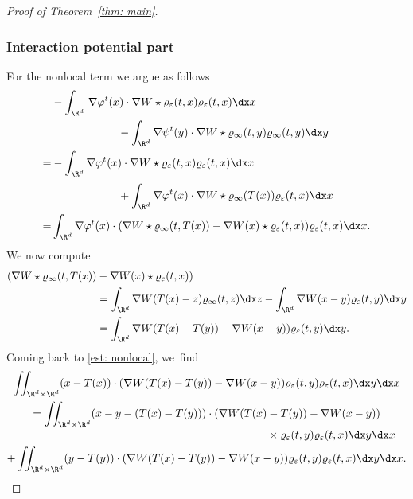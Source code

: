 \begin{proof}[Proof of Theorem~\ref{thm: main}]
\subsubsection*{Interaction potential part}
For the nonlocal term we argue as follows\vspace*{-3pt}
\begin{equation}\label{est: nonlocal}
\begin{split}
&- \int_{\R^d}\!\ \nabla \varphi^t (x) \cdot \nabla W\star \varrho_\varepsilon (t,x) \varrho_\varepsilon(t,x) \dx x\\
&\qquad\qquad\qquad - \int_{\R^d} \nabla \psi^t (y) \cdot \nabla W\star \varrho_\infty (t,y) \varrho_\infty(t,y) \dx y\\
=&- \int_{\R^d} \nabla \varphi^t (x) \cdot \nabla W\star \varrho_\varepsilon (t,x) \varrho_\varepsilon(t,x) \dx x\\[0.2em]
&\qquad\qquad\qquad+ \int_{\R^d} \nabla \varphi^t (x) \cdot \nabla W\star \varrho_\infty (T(x)) \varrho_\varepsilon(t,x) \dx x\\
=&\int_{\R^d} \nabla \varphi^t (x) \cdot (\nabla W\star \varrho_\infty (t,T(x)) - \nabla W(x) \star\varrho_\varepsilon(t,x)) \varrho_\varepsilon(t,x) \dx x.
\end{split}
\end{equation}
We now compute
\begin{equation*}
\begin{aligned}
(\nabla W\star \varrho_\infty (t,T(x)) &- \nabla W(x) \star\varrho_\varepsilon(t,x))\\
&= \int_{\R^d} \nabla W(T(x)-z) \varrho_\infty(t,z) \dx z - \int_{\R^d} \nabla W(x-y) \varrho_\varepsilon(t,y) \dx y\\
&= \int_{\R^d} \nabla W(T(x)-T(y)) - \nabla W(x-y) )\varrho_\varepsilon(t,y) \dx y.
\end{aligned}
\end{equation*}
Coming back to \eqref{est: nonlocal}, we~find\vspace*{-5pt}
\begin{multline*}
\iint_{\R^d\times\R^d} (x- T(x))\cdot (\nabla W(T(x)-T(y)) - \nabla W(x-y)) \varrho_\varepsilon(t,y) \varrho_\varepsilon(t,x) \dx y \dx x\\
=\iint_{\R^d\times\R^d} (x-y - (T(x)-T(y)))\cdot (\nabla W(T(x)-T(y)) - \nabla W(x-y))\\[-3pt]
\shoveright{{}\times \varrho_\varepsilon(t,y) \varrho_\varepsilon(t,x) \dx y \dx x}\\
+ \iint_{\R^d\times\R^d} (y -T(y))\cdot (\nabla W(T(x)-T(y)) - \nabla W(x-y)) \varrho_\varepsilon(t,y) \varrho_\varepsilon(t,x) \dx y \dx x.

\end{multline*}
\end{proof}
